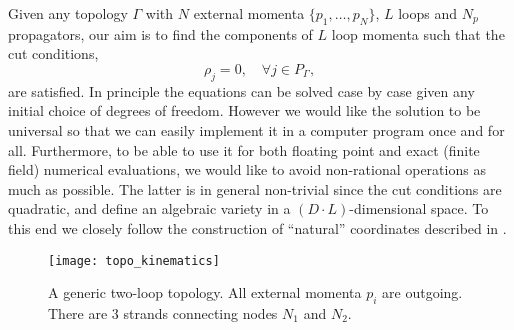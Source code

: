 Given any topology $\Gamma$ with $N$ external momenta $\{p_1,\ldots{},p_N\}$, $L$ loops and $N_p$ propagators, our aim
is to find the components of $L$ loop momenta such that  
the cut conditions,
\[
  \rho_j = 0, \quad \forall j\in P_\Gamma,
\]
are satisfied. 
In principle the equations can be solved case by case given any initial choice of degrees of freedom.
However we would like the solution to be universal so that we can easily
implement it in a computer program once and for all. 
Furthermore, to be able to use it for both floating point and exact (finite field) numerical evaluations, 
we would like to avoid non-rational operations as much as possible.
The latter is in general non-trivial since the cut conditions are quadratic, and
define an algebraic variety in a $(D\cdot L)$-dimensional space.
To this end we closely follow the construction of ``natural'' coordinates described in \cite{Ita:2015tya, Abreu:2017xsl}.

\begin{figure}[ht]
  \centering
  \texttt{[image: topo\_kinematics]}
  \caption{A generic two-loop topology. All external momenta $p_i$ are outgoing. There are 3 strands connecting nodes $N_1$ and $N_2$.}
  \label{fig:topo_kinematics}
\end{figure}

